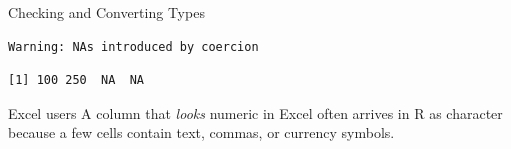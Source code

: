 \documentclass[
  ignorenonframetext,
  aspectratio=169,
]{beamer}
\newenvironment{Shaded}{\begin{snugshade}}{\end{snugshade}}
\newcommand{\FunctionTok}[1]{\textcolor[rgb]{0.28,0.35,0.67}{#1}}
\newcommand{\NormalTok}[1]{\textcolor[rgb]{0.00,0.23,0.31}{#1}}
\newcommand{\StringTok}[1]{\textcolor[rgb]{0.13,0.47,0.30}{#1}}
\begin{document}
\begin{frame}[fragile]{Checking and Converting Types}
\begin{Shaded}
\end{Shaded}

\begingroup\tiny\color{darkgray}

\begin{verbatim}
Warning: NAs introduced by coercion
\end{verbatim}

\endgroup

\begingroup\tiny\color{darkgray}

\begin{verbatim}
[1] 100 250  NA  NA
\end{verbatim}

\endgroup

\begin{exampleblock}{Excel users}
\protect\hypertarget{excel-users}{}
A column that \emph{looks} numeric in Excel often arrives in R as
character because a few cells contain text, commas, or currency symbols.
\end{exampleblock}
\end{frame}
\end{document}
